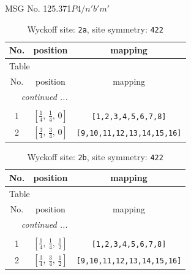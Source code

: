 \documentclass[fleqn,8pt]{jsarticle}
\begin{document}
\setcounter{MaxMatrixCols}{32}

\renewcommand{\tablename}{Table~}
\renewcommand{\figurename}{Figure~}
\begin{center}
\LARGE
MSG No. 125.371\quad$P4/n'b'm'$
\end{center}
\renewcommand{\arraystretch}{1.2}
\begin{longtable}{ccc}
\caption{Wyckoff site: {\tt 2a}, site symmetry: {\tt 422}}
 \\
 \hline \hline
No. & position & mapping \\ \hline \endfirsthead

\multicolumn{2}{l}{\tablename\ \thetable{}} \\
 \hline \hline
No. & position & mapping \\ \hline \endhead

 \hline \hline
\multicolumn{2}{r}{\footnotesize\it continued ...} \\ \endfoot

 \hline \hline
\multicolumn{2}{r}{} \\ \endlastfoot

1 & $\left[ \frac{1}{4},\, \frac{1}{4},\, 0 \right]$ & {\tt [1,2,3,4,5,6,7,8]} \\ \hline
2 & $\left[ \frac{3}{4},\, \frac{3}{4},\, 0 \right]$ & {\tt [9,10,11,12,13,14,15,16]} \\
\end{longtable}
\renewcommand{\arraystretch}{1.2}
\begin{longtable}{ccc}
\caption{Wyckoff site: {\tt 2b}, site symmetry: {\tt 422}}
 \\
 \hline \hline
No. & position & mapping \\ \hline \endfirsthead

\multicolumn{2}{l}{\tablename\ \thetable{}} \\
 \hline \hline
No. & position & mapping \\ \hline \endhead

 \hline \hline
\multicolumn{2}{r}{\footnotesize\it continued ...} \\ \endfoot

 \hline \hline
\multicolumn{2}{r}{} \\ \endlastfoot

1 & $\left[ \frac{1}{4},\, \frac{1}{4},\, \frac{1}{2} \right]$ & {\tt [1,2,3,4,5,6,7,8]} \\ \hline
2 & $\left[ \frac{3}{4},\, \frac{3}{4},\, \frac{1}{2} \right]$ & {\tt [9,10,11,12,13,14,15,16]} \\
\end{longtable}
\end{document}
